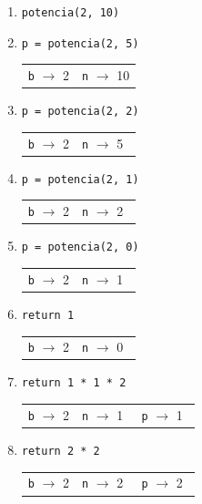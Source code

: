 \begin{enumerate}
\item \verb!potencia(2, 10)!
\item \hspace{1cm} \verb!p = potencia(2, 5) !
\hspace{4cm} \begin{tabular}{|c|c|}\verb|b| $\rightarrow$ 2 & \verb|n| $\rightarrow$ 10\end{tabular}
\item \hspace{2cm} \verb!p = potencia(2, 2) !
\hspace{3cm} \begin{tabular}{|c|c|}\verb|b| $\rightarrow$ 2 & \verb|n| $\rightarrow$ 5$\;\,$\end{tabular}
\item \hspace{3cm} \verb!p = potencia(2, 1) !
\hspace{2cm} \begin{tabular}{|c|c|}\verb|b| $\rightarrow$ 2 & \verb|n| $\rightarrow$ 2$\;\,$\end{tabular}
\item \hspace{4cm} \verb!p = potencia(2, 0) !
\hspace{1cm} \begin{tabular}{|c|c|}\verb|b| $\rightarrow$ 2 & \verb|n| $\rightarrow$ 1$\;\,$\end{tabular}
\item \hspace{5cm} \verb!return 1           !
\hspace{0cm} \begin{tabular}{|c|c|}\verb|b| $\rightarrow$ 2 & \verb|n| $\rightarrow$ 0$\;\,$\end{tabular}
\item \hspace{4cm} \verb!return 1 * 1 * 2   !
\hspace{1cm} \begin{tabular}{|c|c|c|}\verb|b| $\rightarrow$ 2 & \verb|n| $\rightarrow$ 1$\;\,$
& \verb|p| $\rightarrow$ 1$\;\,$ \end{tabular}
\item \hspace{3cm} \verb!return 2 * 2       !
\hspace{2cm} \begin{tabular}{|c|c|c|}\verb|b| $\rightarrow$ 2 & \verb|n| $\rightarrow$ 2$\;\,$
& \verb|p| $\rightarrow$ 2$\;\,$ \end{tabular}

\end{enumerate}
